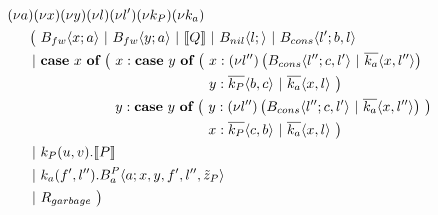 
\begin{align*}
  &\anew{a}{\anew{x}{\anew{y}{\anew{l}{\anew{l'}{\anew{k_P}{\anew{k_a}{ \\
    &\hspace{0.5cm}
    \begin{aligned}[t]
      \big(\ &\ains{B_{fw}}{x}{a}
      \apar   \ains{B_{fw}}{y}{a}
      \apar   \encMJtoAP{Q}
      \apar   \ains{B_{nil}}{l}{}
      \apar   \ains{B_{cons}}{l'}{b, l}
      \\
      \apar
        &\begin{aligned}[t]
          \acse*{x}{\ 
            &\aalt{x}{
              \begin{aligned}[t]
                \acse*{y}{\ 
                  &\aalt{x}{\anew*{l''}{
                    \ains{B_{cons}}{l''}{c,l'} \apar \asnd{k_a}{x,l''}
                  }}\\
                  &\aalt{y}{
                    \asnd{k_P}{b,c} \apar \asnd{k_a}{x,l}
                  }\ 
                }
              \end{aligned}
            }\\
            &\aalt{y}{
              \begin{aligned}[t]
                \acse*{y}{\ 
                  &\aalt{y}{\anew*{l''}{
                    \ains{B_{cons}}{l''}{c,l'} \apar \asnd{k_a}{x,l''}
                  }}\\
                  &\aalt{x}{
                    \asnd{k_P}{c,b} \apar \asnd{k_a}{x,l}
                  }\ 
                }
              \end{aligned}
            }\ 
          }
        \end{aligned}
      \\
      \apar  &\arcv{k_P}{u,v} . \encMJtoAP{P}
      \\
      \apar  &\arcv{k_a}{f',l''} . \ains{B_a^P}{a}{x, y, f', l'',\tilde{z}_P}
      \\
      \apar  &R_{garbage}
      \ \big)
    \end{aligned}
  }}}}}}}
\end{align*}

\TODO{1cm}{cases}

